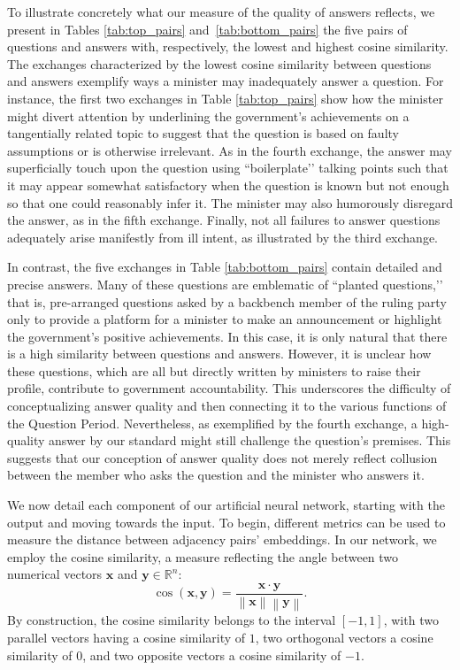 {{To illustrate concretely what our measure of the quality of answers reflects, we present in Tables \ref{tab:top_pairs} and~\ref{tab:bottom_pairs} the five pairs of questions and answers with, respectively, the lowest and highest cosine similarity. The exchanges characterized by the lowest cosine similarity between questions and answers exemplify ways a minister may inadequately answer a question. For instance, the first two exchanges in Table \ref{tab:top_pairs} show how the minister might divert attention by underlining the government’s achievements on a tangentially related topic to suggest that the question is based on faulty assumptions or is otherwise irrelevant. As in the fourth exchange, the answer may superficially touch upon the question using ``boilerplate’’ talking points such that it may appear somewhat satisfactory when the question is known but not enough so that one could reasonably infer it. The minister may also humorously disregard the answer, as in the fifth exchange. Finally, not all failures to answer questions adequately arise manifestly from ill intent, as illustrated by the third exchange.

In contrast, the five exchanges in Table \ref{tab:bottom_pairs} contain detailed and precise answers. Many of these questions are emblematic of ``planted questions,’’ that is, pre-arranged questions asked by a backbench member of the ruling party only to provide a platform for a minister to make an announcement or highlight the government’s positive achievements. In this case, it is only natural that there is a high similarity between questions and answers. However, it is unclear how these questions, which are all but directly written by ministers to raise their profile, contribute to government accountability. This underscores the difficulty of conceptualizing answer quality and then connecting it to the various functions of the Question Period. Nevertheless, as exemplified by the fourth exchange, a high-quality answer by our standard might still challenge the question’s premises. This suggests that our conception of answer quality does not merely reflect collusion between the member who asks the question and the minister who answers it.

We now detail each component of our artificial neural network, starting with the output and moving towards the input. To begin, different metrics can be used to measure the distance between adjacency pairs' embeddings. In our network, we employ the cosine similarity, a measure reflecting the angle between two numerical vectors $\bm{x}$ and $\bm{y} \in \mathbb{R}^{n}$:
\[
    \cos\left(\bm{x}, \bm{y}\right) = \frac{\bm{x} \cdot \bm{y}}{\left \lVert \bm{x} \right \rVert \left \lVert \bm{y} \right \rVert}.
\]
By construction, the cosine similarity belongs to the interval $\left[-1,1\right]$, with two parallel vectors having a cosine similarity of $1$, two orthogonal vectors a cosine similarity of $0$, and two opposite vectors a cosine similarity of $-1$.

}}
